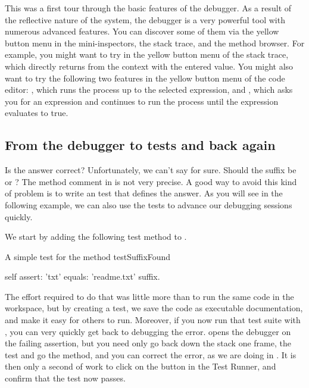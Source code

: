 \documentclass[a4paper,10pt,twoside]{book}
\begin{document}
This was a first tour through the basic features of the debugger.
As a result of the reflective nature of the \squeak system, the debugger is a very powerful tool with numerous advanced features.
You can discover some of them via the yellow button menu in the mini-inspectors, the stack trace, and the method browser.
For example, you might want to try  in the yellow button menu of the stack trace, which directly returns from the context with the entered value.
You might also want to try the following two features in the yellow button menu of the code editor: , which runs the process up to the selected expression, and , which asks you for an expression and continues to run the process until the expression evaluates to true.

\subsection{From the debugger to tests and back again}

Is the answer correct?
Unfortunately, we can't say for sure.
Should the suffix be  or ?
The method comment in  is not very precise.
A good way to avoid this kind of problem is to write an  test that defines the answer.
As you will see in the following example, we can also use the tests to advance our debugging sessions quickly.

We start by adding the following test method  to .

\begin{method}[testSuffix]{A simple test for the  method}
testSuffixFound

	self assert: 'txt' equals: 'readme.txt' suffix.
\end{method}

The effort required to do that was little more than to run the same code in the workspace, but by creating a test, we save the code as executable documentation, and make it easy for others to run.
Moreover, if you now run that test suite with \sunit, you can very quickly get back to debugging the error.
\sunit opens the debugger on the failing assertion, but you need only go back down the stack one frame,  the test and go  the  method, and you can correct the error, as we are doing in .
It is then only a second of work to click on the  button in the \sunit Test Runner, and confirm that the test now passes.
\end{document}
